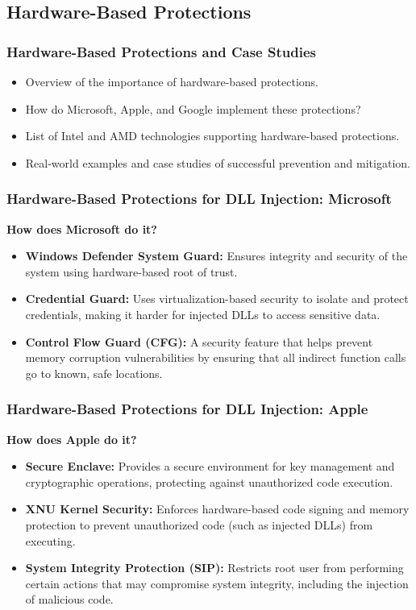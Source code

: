 \subsection{Hardware-Based Protections}
\begin{frame}
    \frametitle{Hardware-Based Protections and Case Studies}
    \begin{itemize}
        \item Overview of the importance of hardware-based protections.
        \item How do Microsoft, Apple, and Google implement these protections?
        \item List of Intel and AMD technologies supporting hardware-based protections.
        \item Real-world examples and case studies of successful prevention and mitigation.
    \end{itemize}
\end{frame}

\begin{frame}
    \frametitle{Hardware-Based Protections for DLL Injection: Microsoft}
    \textbf{How does Microsoft do it?}
    \begin{itemize}
        \item \textbf{Windows Defender System Guard:} Ensures integrity and security of the system using hardware-based root of trust.
        \item \textbf{Credential Guard:} Uses virtualization-based security to isolate and protect credentials, making it harder for injected DLLs to access sensitive data.
        \item \textbf{Control Flow Guard (CFG):} A security feature that helps prevent memory corruption vulnerabilities by ensuring that all indirect function calls go to known, safe locations.
    \end{itemize}
\end{frame}

\begin{frame}
    \frametitle{Hardware-Based Protections for DLL Injection: Apple}
    \textbf{How does Apple do it?}
    \begin{itemize}
        \item \textbf{Secure Enclave:} Provides a secure environment for key management and cryptographic operations, protecting against unauthorized code execution.
        \item \textbf{XNU Kernel Security:} Enforces hardware-based code signing and memory protection to prevent unauthorized code (such as injected DLLs) from executing.
        \item \textbf{System Integrity Protection (SIP):} Restricts root user from performing certain actions that may compromise system integrity, including the injection of malicious code.
    \end{itemize}
\end{frame}

